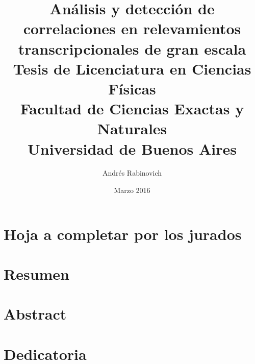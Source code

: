 \documentclass[12pt]{report}
\title{
	{\large Análisis y detección de correlaciones en relevamientos transcripcionales de gran escala}\\
    {Tesis de Licenciatura en Ciencias Físicas}\\
	{\large Facultad de Ciencias Exactas y Naturales}\\
	{\large Universidad de Buenos Aires}
}
\author{Andrés Rabinovich}
\date{Marzo 2016}
\newcommand{\paginaenblanco}{\clearpage\mbox{}\newpage}
\begin{document}
\maketitle
\paginaenblanco
\chapter*{Hoja a completar por los jurados}
\paginaenblanco
\chapter*{Resumen}
\paginaenblanco
\chapter*{Abstract}
\paginaenblanco
\chapter*{Dedicatoria}
\paginaenblanco

\tableofcontents











\clearpage


\end{document}
